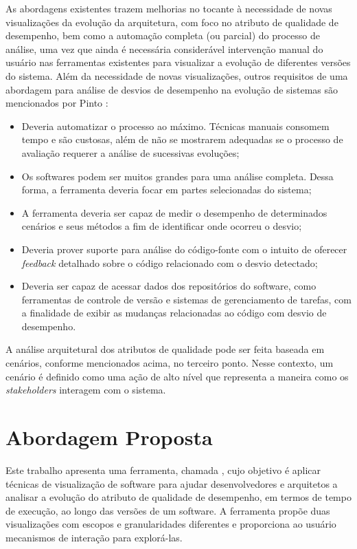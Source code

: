 As abordagens existentes trazem melhorias no tocante à necessidade de novas visualizações da evolução da arquitetura, com foco no atributo de qualidade de desempenho, bem como a automação completa (ou parcial) do processo de análise, uma vez que ainda é necessária considerável intervenção manual do usuário nas ferramentas existentes para visualizar a evolução de diferentes versões do sistema. Além da necessidade de novas visualizações, outros requisitos de uma abordagem para análise de desvios de desempenho na evolução de sistemas são mencionados por Pinto \cite{Pinto2015}:
\begin{itemize}
	\item Deveria automatizar o processo ao máximo. Técnicas manuais consomem tempo e são custosas, além de não se mostrarem adequadas se o processo de avaliação requerer a análise de sucessivas evoluções;
	\item Os softwares podem ser muitos grandes para uma análise completa. Dessa forma, a ferramenta deveria focar em partes selecionadas do sistema;
	\item A ferramenta deveria ser capaz de medir o desempenho de determinados cenários e seus métodos a fim de identificar onde ocorreu o desvio;
	\item Deveria prover suporte para análise do código-fonte com o intuito de oferecer \textit{feedback} detalhado sobre o código relacionado com o desvio detectado;
	\item Deveria ser capaz de acessar dados dos repositórios do software, como ferramentas de controle de versão e sistemas de gerenciamento de tarefas, com a finalidade de exibir as mudanças relacionadas ao código com desvio de desempenho.
\end{itemize}

A análise arquitetural dos atributos de qualidade pode ser feita baseada em cenários, conforme mencionados acima, no terceiro ponto. Nesse contexto, um cenário é definido como uma ação de alto nível que representa a maneira como os \textit{stakeholders} interagem com o sistema.

\section{Abordagem Proposta} \label{sec:abordagem-proposta}

Este trabalho apresenta uma ferramenta, chamada \textit{\toolName}, cujo objetivo é aplicar técnicas de visualização de software para ajudar desenvolvedores e arquitetos a analisar a evolução do atributo de qualidade de desempenho, em termos de tempo de execução, ao longo das versões de um software. A ferramenta propõe duas visualizações com escopos e granularidades diferentes e proporciona ao usuário mecanismos de interação para explorá-las.

